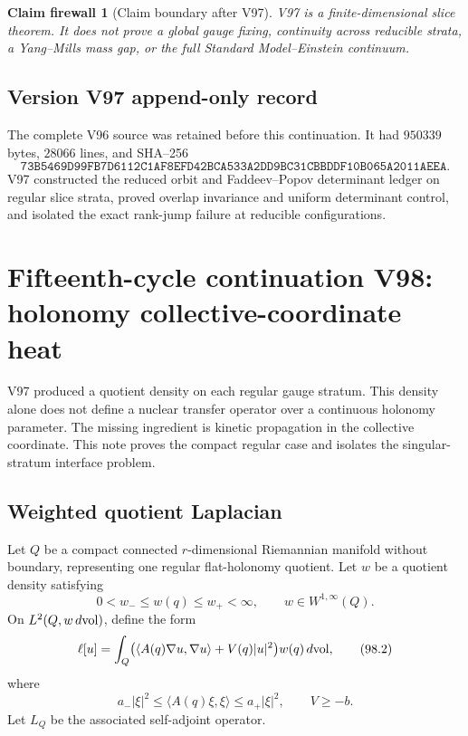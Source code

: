 \documentclass[11pt]{article}
\newtheorem{firewall}[theorem]{Claim firewall}
\theoremstyle{remark}
\begin{document}
\begin{firewall}[Claim boundary after V97]
\label{fire:v15v97}
V97 is a finite-dimensional slice theorem.  It does not prove a
global gauge fixing, continuity across reducible strata, a
Yang--Mills mass gap, or the full Standard Model--Einstein
continuum.
\end{firewall}

\section*{Version V97 append-only record}
The complete V96 source was retained before this continuation.  It
had \(950339\) bytes, \(28066\) lines, and SHA--256
\[
 \texttt{73B5469D99FB7D6112C1AF8EFD42BCA533A2DD9BC31CBBDDF10B065A2011AEEA}.
\]
V97 constructed the reduced orbit and Faddeev--Popov determinant
ledger on regular slice strata, proved overlap invariance and
uniform determinant control, and isolated the exact rank-jump
failure at reducible configurations.
\chapter{Fifteenth-cycle continuation V98: holonomy collective-coordinate heat}
\label{sec:v15v98}

V97 produced a quotient density on each regular gauge stratum.
This density alone does not define a nuclear transfer operator over
a continuous holonomy parameter.  The missing ingredient is kinetic
propagation in the collective coordinate.  This note proves the
compact regular case and isolates the singular-stratum interface
problem.

\section{Weighted quotient Laplacian}

Let \(Q\) be a compact connected \(r\)-dimensional Riemannian
manifold without boundary, representing one regular flat-holonomy
quotient.  Let \(w\) be a quotient density satisfying
\[
 0<w_-\leq w(q)\leq w_+<\infty,\qquad
 w\in W^{1,\infty}(Q).                                \tag{98.1}
\]
On \(L^2(Q,w\,d{\rm vol})\), define the form
\[
 \ell[u]
 =\int_Q\bigl(\langle A(q)\nabla u,\nabla u\rangle
                  +V(q)|u|^2\bigr)w(q)\,d{\rm vol},  \tag{98.2}
\]
where
\[
 a_-|\xi|^2\leq\langle A(q)\xi,\xi\rangle
 \leq a_+|\xi|^2,\qquad V\geq-b.                      \tag{98.3}
\]
Let \(L_Q\) be the associated self-adjoint operator.
\end{document}
